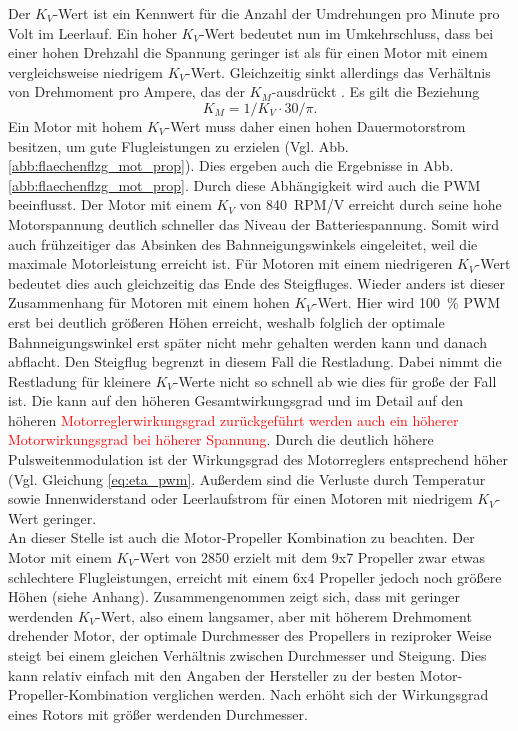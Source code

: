 Der \ensuremath{K_V}-Wert ist ein Kennwert für die Anzahl der Umdrehungen pro Minute pro Volt im Leerlauf. Ein hoher \ensuremath{K_V}-Wert bedeutet nun im Umkehrschluss, dass bei einer hohen Drehzahl die Spannung geringer ist als für einen Motor mit einem vergleichsweise niedrigem \ensuremath{K_V}-Wert. Gleichzeitig sinkt allerdings das Verhältnis von Drehmoment pro Ampere, das der \ensuremath{K_M}-ausdrückt  \cite[S.35 und S.42-43]{Buchi.2013}. Es gilt die Beziehung
\begin{equation}
	K_M = 1/K_V\cdot 30/\pi.
\end{equation}
Ein Motor mit hohem \ensuremath{K_V}-Wert muss daher einen hohen Dauermotorstrom besitzen, um gute Flugleistungen zu erzielen (Vgl. Abb. \ref{abb:flaechenflzg_mot_prop}). Dies ergeben auch die Ergebnisse in Abb. \ref{abb:flaechenflzg_mot_prop}. Durch diese Abhängigkeit wird auch die PWM beeinflusst. Der Motor mit einem \ensuremath{K_V} von \SI{840}{RPM/V} erreicht durch seine hohe Motorspannung deutlich schneller das Niveau der Batteriespannung. Somit wird auch frühzeitiger das Absinken des Bahnneigungswinkels eingeleitet, weil die maximale Motorleistung erreicht ist. Für Motoren mit einem niedrigeren \ensuremath{K_V}-Wert bedeutet dies auch gleichzeitig das Ende des Steigfluges. Wieder anders ist dieser Zusammenhang für Motoren mit einem hohen \ensuremath{K_V}-Wert. Hier wird \SI{100}{\%} PWM erst bei deutlich größeren Höhen erreicht, weshalb folglich der optimale Bahnneigungswinkel erst später nicht mehr gehalten werden kann und danach abflacht. Den Steigflug begrenzt in diesem Fall die Restladung. Dabei nimmt die Restladung für kleinere \ensuremath{K_V}-Werte nicht so schnell ab wie dies für große der Fall ist. Die kann auf den höheren Gesamtwirkungsgrad und im Detail auf den höheren \textcolor{red}{Motorreglerwirkungsgrad zurückgeführt werden auch ein höherer Motorwirkungsgrad bei höherer Spannung}. Durch die deutlich höhere Pulsweitenmodulation ist der Wirkungsgrad des Motorreglers entsprechend höher (Vgl. Gleichung \ref{eq:eta_pwm}. Außerdem sind die Verluste durch Temperatur  sowie Innenwiderstand oder Leerlaufstrom für einen Motoren mit niedrigem \ensuremath{K_V}-Wert geringer.\\
An dieser Stelle ist auch die Motor-Propeller Kombination zu beachten. Der Motor mit einem \ensuremath{K_V}-Wert von 2850 erzielt mit dem 9x7 Propeller zwar etwas schlechtere Flugleistungen, erreicht mit einem 6x4 Propeller jedoch noch größere Höhen (siehe Anhang). Zusammengenommen zeigt sich, dass mit geringer werdenden \ensuremath{K_V}-Wert, also einem langsamer, aber mit höherem Drehmoment drehender Motor, der optimale Durchmesser des Propellers in reziproker Weise steigt bei einem gleichen Verhältnis zwischen Durchmesser und Steigung. Dies kann relativ einfach mit den Angaben der Hersteller zu der besten Motor-Propeller-Kombination verglichen werden. Nach \cite{Wall.2015} erhöht sich der Wirkungsgrad eines Rotors mit größer werdenden Durchmesser. 
